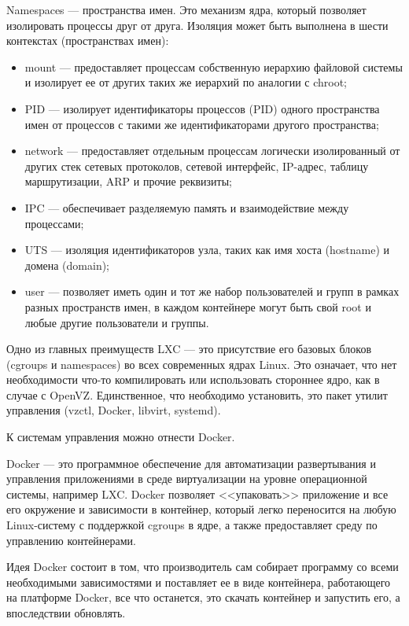 Namespaces --- пространства имен.
Это механизм ядра, который позволяет изолировать процессы друг от друга.
Изоляция может быть выполнена в шести контекстах (пространствах имен):
\begin{itemize}
  \item mount --- предоставляет процессам собственную иерархию файловой системы и изолирует ее от других таких же иерархий по аналогии с chroot;
  \item PID --- изолирует идентификаторы процессов (PID) одного пространства имен от процессов с такими же идентификаторами другого пространства;
  \item network --- предоставляет отдельным процессам логически изолированный от других стек сетевых протоколов, сетевой интерфейс, IP-адрес, таблицу маршрутизации, ARP и прочие реквизиты;
  \item IPC --- обеспечивает разделяемую память и взаимодействие между процессами;
  \item UTS --- изоляция идентификаторов узла, таких как имя хоста (hostname) и домена (domain);
  \item user --- позволяет иметь один и тот же набор пользователей и групп в рамках разных пространств имен, в каждом контейнере могут быть свой root и любые другие пользователи и группы.
\end{itemize}

Одно из главных преимуществ LXC --- это присутствие его базовых блоков (cgroups и namespaces) во всех современных ядрах Linux.
Это означает, что нет необходимости что-то компилировать или использовать стороннее ядро, как в случае с OpenVZ.
Единственное, что необходимо установить, это пакет утилит управления (vzctl, Docker, libvirt, systemd).

К системам управления можно отнести Docker.

Docker --- это программное обеспечение для автоматизации развертывания и управления приложениями в среде виртуализации на уровне операционной системы, например LXC.
Docker позволяет <<упаковать>> приложение и все его окружение и зависимости в контейнер, который легко переносится на любую Linux-систему с поддержкой cgroups в ядре, а также предоставляет среду по управлению контейнерами.

Идея Docker состоит в том, что производитель сам собирает программу со всеми необходимыми зависимостями и поставляет ее в виде контейнера, работающего на платформе Docker, все что останется, это скачать контейнер и запустить его, а впоследствии обновлять.

